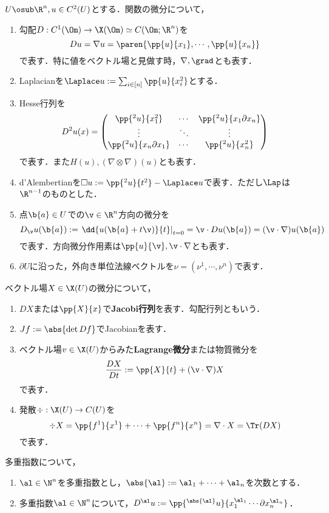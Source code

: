 \documentclass[uplatex,dvipdfmx]{jsreport}
\begin{document}
\begin{notation}
    $U\osub\R^n,u\in C^2(U)$とする．関数の微分について，
    \begin{enumerate}
        \item 勾配$D:C^1(\Om)\to\X(\Om)\simeq C(\Om;\R^n)$を
        \[Du=\nabla u=\paren{\pp{u}{x_1},\cdots,\pp{u}{x_n}}\]
        で表す．特に値をベクトル場と見做す時，$\nabla,\grad$とも表す．
        \item Laplacianを$\Laplace u:=\sum_{i\in[n]}\pp{u}{x_i^2}$とする．
        \item Hesse行列を
        \[D^2u(x)=\begin{pmatrix}\pp{^2u}{x_1^2}&\cdots&\pp{^2u}{x_1\partial x_n}\\\vdots&\ddots&\vdots\\\pp{^2u}{x_n\partial x_1}&\cdots&\pp{^2u}{x_n^2}\end{pmatrix}\]
        で表す．また$H(u),(\nabla\otimes\nabla)(u)$とも表す．
        \item d'Alembertianを$\Box u:= \pp{^2u}{t^2}-\Laplace u$で表す．ただし$\Lap$は$\R^{n-1}$のものとした．
        \item 点$\b{a}\in U$での$\v\in\R^n$方向の微分を
        \[D_{\v} u(\b{a}):=\left.\dd{u(\b{a}+t\v)}{t}\right|_{t=0}=\v\cdot Du(\b{a})=(\v\cdot\nabla) u(\b{a})\]
        で表す．方向微分作用素は$\pp{u}{\v},\v\cdot\nabla$とも表す．
        \item $\partial U$に沿った，外向き単位法線ベクトルを$\nu=(\nu^1,\cdots,\nu^n)$で表す．
    \end{enumerate}
    ベクトル場$X\in\X(U)$の微分について，
    \begin{enumerate}
        \item $DX$または$\pp{X}{x}$で\textbf{Jacobi行列}を表す．勾配行列ともいう．
        \item $Jf:=\abs{\det Df}$でJacobianを表す．
        \item ベクトル場$v\in\X(U)$からみた\textbf{Lagrange微分}または物質微分を
        \[\frac{DX}{Dt}:=\pp{X}{t}+(\v\cdot\nabla)X\]
        で表す．
        \item 発散$\div:\X(U)\to C(U)$を
        \[\div X=\pp{f^1}{x^1}+\cdots+\pp{f^n}{x^n}=\nabla\cdot X=\Tr(DX)\]
        で表す．
    \end{enumerate}
    多重指数について，
    \begin{enumerate}
        \item $\al\in\N^n$を多重指数とし，$\abs{\al}:=\al_1+\cdots+\al_n$を次数とする．
        \item 多重指数$\al\in\N^n$について，$D^\al u:=\pp{^{\abs{\al}}u}{x_1^{\al_1}\cdots\partial x^{\al_n}_n}$．

\end{enumerate}
\end{notation}
\end{document}
